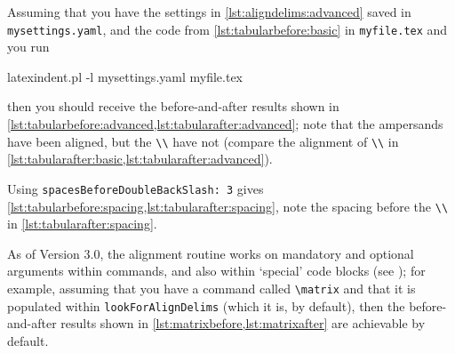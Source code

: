 Assuming that you have the settings in \cref{lst:aligndelims:advanced} saved in \texttt{mysettings.yaml}, and the code 
from \cref{lst:tabularbefore:basic} in \texttt{myfile.tex} and you run
\begin{commandshell}
latexindent.pl -l mysettings.yaml myfile.tex 
\end{commandshell}
then you should receive the before-and-after results shown in
\cref{lst:tabularbefore:advanced,lst:tabularafter:advanced}; note that the ampersands have been aligned, but
the \lstinline!\\! have not (compare the alignment of \lstinline!\\! in \cref{lst:tabularafter:basic,lst:tabularafter:advanced}).

\begin{minipage}{.45\textwidth}
\end{minipage}%
\hfill
\begin{minipage}{.45\textwidth}
\end{minipage}%

Using  \texttt{spacesBeforeDoubleBackSlash: 3} gives \cref{lst:tabularbefore:spacing,lst:tabularafter:spacing},
note the spacing before the \lstinline!\\! in \cref{lst:tabularafter:spacing}.

\begin{minipage}{.45\textwidth}
\end{minipage}%
\hfill
\begin{minipage}{.45\textwidth}
\end{minipage}%

As of Version 3.0, the alignment routine works on mandatory and optional arguments within commands, and also within `special' code blocks 
(see ); for example, assuming that you have a command called \lstinline!\matrix!
and that it is populated within \texttt{lookForAlignDelims} (which it is, by default), then the before-and-after results
shown in \cref{lst:matrixbefore,lst:matrixafter} are achievable by default.

